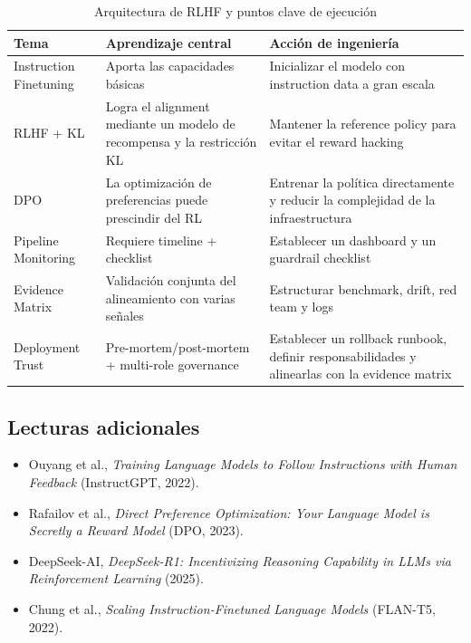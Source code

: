 \begin{table}[H]
\centering
\begin{tabular}{p{} p{} p{}}
\toprule
Tema & Aprendizaje central & Acción de ingeniería \\
\midrule
Instruction Finetuning & Aporta las capacidades básicas & Inicializar el modelo con instruction data a gran escala \\
RLHF + KL & Logra el alignment mediante un modelo de recompensa y la restricción KL & Mantener la reference policy para evitar el reward hacking \\
DPO & La optimización de preferencias puede prescindir del RL & Entrenar la política directamente y reducir la complejidad de la infraestructura \\
Pipeline Monitoring & Requiere timeline + checklist & Establecer un dashboard y un guardrail checklist \\
Evidence Matrix & Validación conjunta del alineamiento con varias señales & Estructurar benchmark, drift, red team y logs \\
Deployment Trust & Pre-mortem/post-mortem + multi-role governance & Establecer un rollback runbook, definir responsabilidades y alinearlas con la evidence matrix \\
\bottomrule
\end{tabular}
\caption{Arquitectura de RLHF y puntos clave de ejecución}
\end{table}

\subsection{Lecturas adicionales}
\begin{itemize}
    \item Ouyang et al., \textit{Training Language Models to Follow Instructions with Human Feedback} (InstructGPT, 2022).
    \item Rafailov et al., \textit{Direct Preference Optimization: Your Language Model is Secretly a Reward Model} (DPO, 2023).
    \item DeepSeek-AI, \textit{DeepSeek-R1: Incentivizing Reasoning Capability in LLMs via Reinforcement Learning} (2025).
    \item Chung et al., \textit{Scaling Instruction-Finetuned Language Models} (FLAN-T5, 2022).
\end{itemize}


